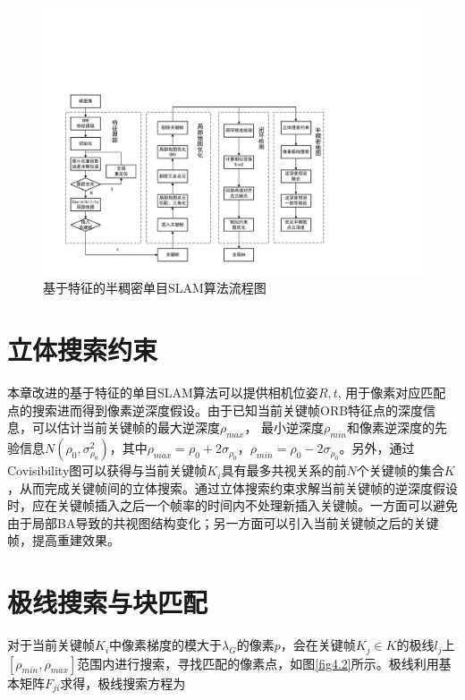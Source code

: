 \begin{figure}[h]
\centering
\includegraphics[scale=0.4,angle=-90]{figures/Fig4-1.pdf}
\caption{基于特征的半稠密单目SLAM算法流程图}
\label{fig4.1}
\end{figure}





\section{立体搜索约束}
本章改进的基于特征的单目SLAM算法可以提供相机位姿$R,t$, 用于像素对应匹配点的搜索进而得到像素逆深度假设。由于已知当前关键帧ORB特征点的深度信息，可以估计当前关键帧的最大逆深度$\rho_{max}$， 最小逆深度$\rho_{min}$和像素逆深度的先验信息$N\left( \rho_0,\sigma_{\rho_0}^2  \right)$，其中$\rho_{max}=\rho_0+2\sigma_{\rho_0}$，$\rho_{min}=\rho_0-2\sigma_{\rho_0}$。另外，通过Covisibility图可以获得与当前关键帧$K_i$具有最多共视关系的前$N$个关键帧的集合$K$，从而完成关键帧间的立体搜索。通过立体搜索约束求解当前关键帧的逆深度假设时，应在关键帧插入之后一个帧率的时间内不处理新插入关键帧。一方面可以避免由于局部BA导致的共视图结构变化；另一方面可以引入当前关键帧之后的关键帧，提高重建效果。


\section{极线搜索与块匹配}
对于当前关键帧$K_i$中像素梯度的模大于$\lambda_G$的像素$p$，会在关键帧$K_j \in K$的极线$l_j$上$\left[ \rho_{min}, \rho_{max} \right]$范围内进行搜索，寻找匹配的像素点，如图\ref{fig4.2}所示。极线利用基本矩阵$F_{ji}$求得，极线搜索方程为

